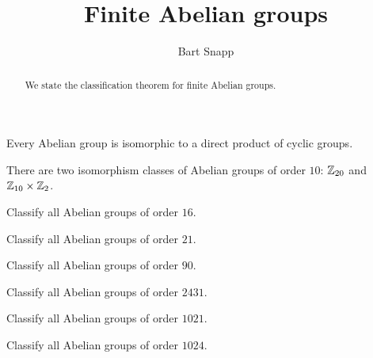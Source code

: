 \documentclass{ximera}
\author{Bart Snapp}
\title{Finite Abelian groups}
\begin{document}
\begin{abstract}
  We state the classification theorem for finite Abelian groups.
\end{abstract}
\maketitle

\begin{theorem}
  Every Abelian group is isomorphic to a direct product of cyclic groups.
\end{theorem}



\begin{example}
  There are two isomorphism classes of Abelian groups of order $10$:
  $\mathbb Z_{20}$ and $\mathbb Z_{10}\times\mathbb Z_2$.
\end{example}



\begin{exercise}
  Classify all Abelian groups of order $16$.
\end{exercise}

\begin{exercise}
  Classify all Abelian groups of order $21$.
\end{exercise}

\begin{exercise}
  Classify all Abelian groups of order $90$.
\end{exercise}


\begin{exercise}
  Classify all Abelian groups of order $2431$.
\end{exercise}

\begin{exercise}
  Classify all Abelian groups of order $1021$.
\end{exercise}

\begin{exercise}
  Classify all Abelian groups of order $1024$.
\end{exercise}
\end{document}
